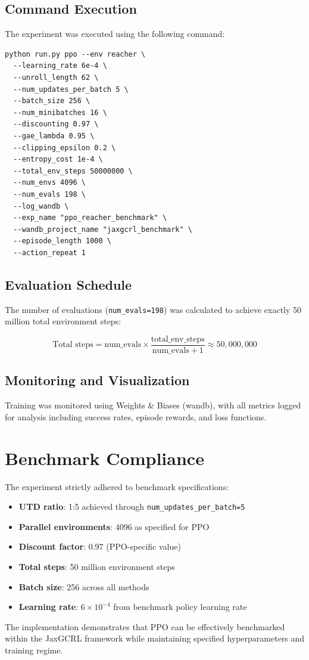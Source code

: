 \documentclass[conference]{IEEEtran}
\begin{document}
\subsection{Command Execution}
The experiment was executed using the following command:

\begin{verbatim}
python run.py ppo --env reacher \
  --learning_rate 6e-4 \
  --unroll_length 62 \
  --num_updates_per_batch 5 \
  --batch_size 256 \
  --num_minibatches 16 \
  --discounting 0.97 \
  --gae_lambda 0.95 \
  --clipping_epsilon 0.2 \
  --entropy_cost 1e-4 \
  --total_env_steps 50000000 \
  --num_envs 4096 \
  --num_evals 198 \
  --log_wandb \
  --exp_name "ppo_reacher_benchmark" \
  --wandb_project_name "jaxgcrl_benchmark" \
  --episode_length 1000 \
  --action_repeat 1
\end{verbatim}

\subsection{Evaluation Schedule}
The number of evaluations (\texttt{num\_evals=198}) was calculated to achieve exactly 50 million total environment steps:

\begin{equation}
\text{Total steps} = \text{num\_evals} \times \frac{\text{total\_env\_steps}}{\text{num\_evals} + 1} \approx 50,000,000
\end{equation}

\subsection{Monitoring and Visualization}
Training was monitored using Weights \& Biases (wandb), with all metrics logged for analysis including success rates, episode rewards, and loss functions.

\section{Benchmark Compliance}

The experiment strictly adhered to benchmark specifications:
\begin{itemize}
\item \textbf{UTD ratio}: 1:5 achieved through \texttt{num\_updates\_per\_batch=5}
\item \textbf{Parallel environments}: 4096 as specified for PPO
\item \textbf{Discount factor}: 0.97 (PPO-specific value)
\item \textbf{Total steps}: 50 million environment steps
\item \textbf{Batch size}: 256 across all methods
\item \textbf{Learning rate}: $6 \times 10^{-4}$ from benchmark policy learning rate
\end{itemize}

The implementation demonstrates that PPO can be effectively benchmarked within the JaxGCRL framework while maintaining specified hyperparameters and training regime.
\end{document}
